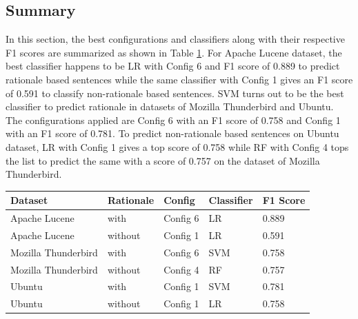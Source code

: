 \documentclass[a4paper,12pt,twoside]{report}
\begin{document}
\subsection{Summary}
In this section, the best configurations and classifiers along with their respective F1 scores are summarized as shown in Table \ref{tab:summaryBC}. For Apache Lucene dataset, the best classifier happens to be \acs{LR} with Config 6 and F1 score of 0.889 to predict rationale based sentences while the same classifier with Config 1 gives an F1 score of 0.591 to classify non-rationale based sentences. \acs{SVM} turns out to be the best classifier to predict rationale in datasets of Mozilla Thunderbird and Ubuntu. The configurations applied are Config 6 with an F1 score of 0.758 and Config 1 with an F1 score of 0.781. To predict non-rationale based sentences on Ubuntu dataset, \acs{LR} with Config 1 gives a top score of 0.758 while \acs{RF} with Config 4 tops the list to predict the same with a score of 0.757 on the dataset of Mozilla Thunderbird. 
\begin{table} %
    \centering
    \begin{adjustbox}{max width=\columnwidth}
    \def\arraystretch{1} %
    \begin{tabular}{p{4cm} p{2cm} p{2cm} p{2cm} p{2cm}}
        \toprule
        \textbf{Dataset} & \textbf{Rationale} & \textbf{Config} & \textbf{Classifier} & \textbf{F1 Score}\\
        \midrule
			Apache Lucene & with & Config 6 & LR & 0.889 \\
			Apache Lucene & without & Config 1 & LR & 0.591 \\
		\midrule
			Mozilla Thunderbird & with & Config 6 & SVM & 0.758 \\ 
			Mozilla Thunderbird & without & Config 4 & RF & 0.757 \\ 
		\midrule
			Ubuntu & with & Config 1 & SVM & 0.781 \\
			Ubuntu & without & Config 1 & LR & 0.758 \\
        \midrule
    \end{tabular}
    \end{adjustbox}
    \label{tab:summaryBC}
\end{table}
\end{document}
